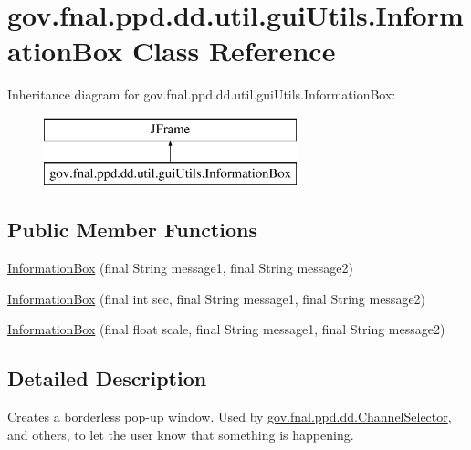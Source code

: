 \hypertarget{classgov_1_1fnal_1_1ppd_1_1dd_1_1util_1_1guiUtils_1_1InformationBox}{\section{gov.\-fnal.\-ppd.\-dd.\-util.\-gui\-Utils.\-Information\-Box Class Reference}
\label{classgov_1_1fnal_1_1ppd_1_1dd_1_1util_1_1guiUtils_1_1InformationBox}
}
Inheritance diagram for gov.\-fnal.\-ppd.\-dd.\-util.\-gui\-Utils.\-Information\-Box\-:\begin{figure}[H]
\begin{center}
\leavevmode
\includegraphics[height=2.000000cm]{classgov_1_1fnal_1_1ppd_1_1dd_1_1util_1_1guiUtils_1_1InformationBox}
\end{center}
\end{figure}
\subsection*{Public Member Functions}
\begin{DoxyCompactItemize}
\item 
\hyperlink{classgov_1_1fnal_1_1ppd_1_1dd_1_1util_1_1guiUtils_1_1InformationBox_af2cfcbee5d202adf42d3fdebde0b6f8f}{Information\-Box} (final String message1, final String message2)
\item 
\hyperlink{classgov_1_1fnal_1_1ppd_1_1dd_1_1util_1_1guiUtils_1_1InformationBox_ae41d74aebb8ce1fae7585ce25a8f2d1e}{Information\-Box} (final int sec, final String message1, final String message2)
\item 
\hyperlink{classgov_1_1fnal_1_1ppd_1_1dd_1_1util_1_1guiUtils_1_1InformationBox_a8d529bff9a997e933cd317b74544ce3b}{Information\-Box} (final float scale, final String message1, final String message2)
\end{DoxyCompactItemize}


\subsection{Detailed Description}
Creates a borderless pop-\/up window. Used by \hyperlink{classgov_1_1fnal_1_1ppd_1_1dd_1_1ChannelSelector}{gov.\-fnal.\-ppd.\-dd.\-Channel\-Selector}, and others, to let the user know that something is happening.

